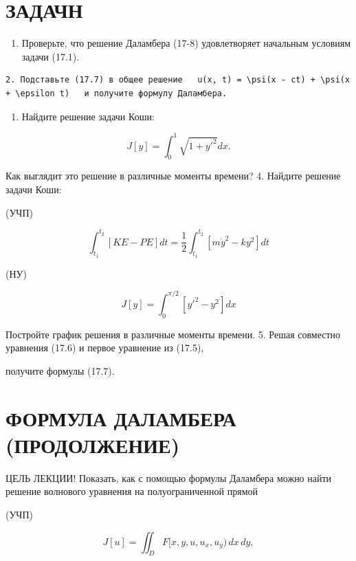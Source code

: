 \documentclass[
  ukrainian,
]{article}
\providecommand{\tightlist}{%
  \setlength{\itemsep}{0pt}\setlength{\parskip}{0pt}}
\begin{document}
\section{ЗАДАЧН}\label{ux437ux430ux434ux430ux447ux43d}

\begin{enumerate}
\def\labelenumi{\arabic{enumi}.}
\tightlist
\item
  Проверьте, что решение Даламбера (17-8) удовлетворяет начальным
  условиям задачи (17.1).
\end{enumerate}

\begin{verbatim}
2. Подставьте (17.7) в общее решение   u(x, t) = \psi(x - ct) + \psi(x + \epsilon t)   и получите формулу Даламбера.
\end{verbatim}

\begin{enumerate}
\def\labelenumi{\arabic{enumi}.}
\setcounter{enumi}{2}
\tightlist
\item
  Найдите решение задачи Коши:
\end{enumerate}

\[
J[y] = \int_{0}^{1} \sqrt{1 + y'^{2}} dx.
\]

Как выглядит это решение в различные моменты времени? 4. Найдите решение
задачи Коши:

(УЧП)

\[
\int_{t_{1}}^{t_{2}} [KE - PE] dt = \frac{1}{2} \int_{t_{1}}^{t_{2}} [m\dot{y}^{2} - ky^{2}] dt
\]

(НУ)

\[
J[y] = \int_{0}^{\pi/2} [y'^{2} - y^{2}] dx
\]

Постройте график решения в различные моменты времени. 5. Решая совместно
уравнения (17.6) и первое уравнение из (17.5),

получите формулы (17.7).

\section{ФОРМУЛА ДАЛАМБЕРА
(ПРОДОЛЖЕНИЕ)}\label{ux444ux43eux440ux43cux443ux43bux430-ux434ux430ux43bux430ux43cux431ux435ux440ux430-ux43fux440ux43eux434ux43eux43bux436ux435ux43dux438ux435}

ЦЕЛЬ ЛЕКЦИИ! Показать, как с помощью формулы Даламбера можно найти
решение волнового уравнения на полуограниченной прямой

(УЧП)

\[
J[u] = \iint_D F[x, y, u, u_x, u_y) \, dx \, dy,
\]
\end{document}
